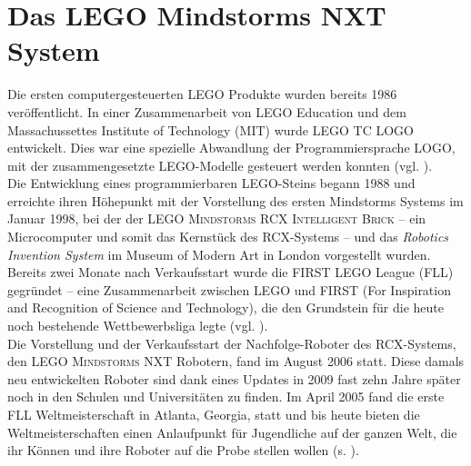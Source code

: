 \documentclass[paper=a4, DIV=calc, BCOR=15mm, twoside=on, onecolumn=on, open = right, titlepage =on, parskip =half, headsepline = on, footsepline = on, chapterprefix = off, appendixprefix = off, fontsize = 12pt, numbers = noenddot, abstract = on]{scrbook}
\begin{document}
\section{Das LEGO Mindstorms NXT System}
\onehalfspacing
Die ersten computergesteuerten \textsc{LEGO} Produkte wurden bereits 1986 veröffentlicht. In einer Zusammenarbeit von \textsc{LEGO} Education und dem Massachussettes Institute of Technology (MIT) wurde \textsc{LEGO TC LOGO} entwickelt. Dies war eine spezielle Abwandlung der Programmiersprache LOGO, mit der zusammengesetzte \textsc{LEGO}-Modelle gesteuert werden konnten (vgl. \cite{rolling:14}).\\
Die Entwicklung eines programmierbaren \textsc{LEGO}-Steins begann 1988 und erreichte ihren Höhepunkt mit der Vorstellung des ersten Mindstorms Systems im Januar 1998, bei der der \textsc{LEGO Mindstorms RCX Intelligent Brick} -- ein Microcomputer und somit das Kernstück des RCX-Systems -- und das \emph{Robotics Invention System} im Museum of Modern Art in London vorgestellt wurden.\\
Bereits zwei Monate nach Verkaufsstart wurde die FIRST LEGO League (FLL) gegründet -- eine Zusammenarbeit zwischen \textsc{LEGO} und FIRST (For Inspiration and Recognition of Science and Technology), die den Grundstein für die heute noch bestehende Wettbewerbsliga legte (vgl. \cite{rolling:14}).\\
Die Vorstellung und der Verkaufsstart der Nachfolge-Roboter des RCX-Systems, den \textsc{LEGO Mindstorms} NXT Robotern, fand im August 2006 statt. Diese damals neu entwickelten Roboter sind dank eines Updates in 2009 fast zehn Jahre später noch in den Schulen und Universitäten zu finden. Im April 2005 fand die erste FLL Weltmeisterschaft in Atlanta, Georgia, statt und bis heute bieten die Weltmeisterschaften einen Anlaufpunkt für Jugendliche auf der ganzen Welt, die ihr Können und ihre Roboter auf die Probe stellen wollen (s. \cite{lego}).

\par \singlespacing
\end{document}
